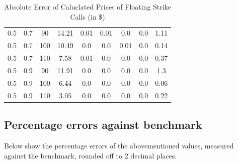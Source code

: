 \documentclass{article}
\begin{document}
\begin{table}[H]
\begin{tabular}{|c|c|c|c|c|c|c|c|c|}
  0.5 & 0.7 & 90 & 14.21 & 0.01 & 0.01 & 0.0 & 0.0 & 1.11 \\
  0.5 & 0.7 & 100 & 10.49 & 0.0 & 0.0 & 0.01 & 0.0 & 0.14 \\
  0.5 & 0.7 & 110 & 7.58 & 0.01 & 0.0 & 0.0 & 0.0 & 0.37 \\
  0.5 & 0.9 & 90 & 11.91 & 0.0 & 0.0 & 0.0 & 0.0 & 1.3 \\
  0.5 & 0.9 & 100 & 6.44 & 0.0 & 0.0 & 0.0 & 0.0 & 0.06 \\
  0.5 & 0.9 & 110 & 3.05 & 0.0 & 0.0 & 0.0 & 0.0 & 0.22 \\
  \hline
  \end{tabular}
  \caption{Absolute Error of Caluclated Prices of Floating Strike Calls (in \$)}
  \label{table:name}
\end{table}
\normalsize

\subsection{Percentage errors against benchmark}
Below show the percentage errors of the abovementioned values, measured against the benchmark, rounded off to 2 decimal places.
\end{document}
